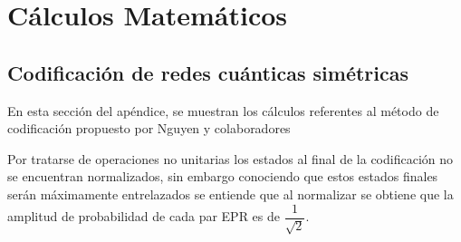 \usepackage[letterpaper , top=2cm, bottom=2cm, left=3cm, right=2cm]{geometry}
\usepackage[utf8]{inputenc} 			%
\usepackage[spanish]{babel} 			%
\usepackage[T1]{fontenc}  				%
\usepackage{amsfonts}					%
\usepackage{times}						%
\usepackage{amsmath}					%
\usepackage{amssymb}					%
\usepackage{physics}					%

\newcommand{\K}[1]{$\ket{#1}$} 


\chapter{Cálculos Matemáticos}
\section{Codificación de redes cuánticas simétricas}
En esta sección del apéndice, se muestran los cálculos referentes al método de codificación propuesto por Nguyen y colaboradores %
\par
Por tratarse de operaciones no unitarias los estados al final de la codificación no se encuentran normalizados, sin embargo conociendo que estos estados finales serán máximamente entrelazados se entiende que al normalizar se obtiene que la amplitud de probabilidad de cada par EPR es de $\dfrac{1}{\sqrt{2}}$.
